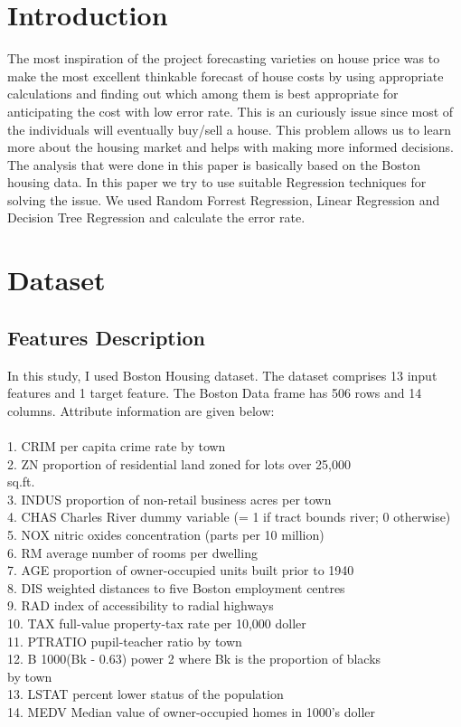 \documentclass[conference]{IEEEtran}
\begin{document}
\section{Introduction}
The most inspiration of the project forecasting varieties on house price was to make the most excellent thinkable forecast of house costs by using appropriate calculations and finding out which among them is best appropriate for anticipating the cost with low error rate. This is an curiously issue since most of the individuals will eventually buy/sell a house. This problem allows us to learn more about the housing market and helps with making more informed decisions. The analysis that were done in this paper is basically based on the Boston housing data. In this paper we try to use suitable Regression techniques for solving the issue. We used Random Forrest Regression, Linear Regression and Decision Tree Regression and calculate the error rate. 

\section{Dataset}

\subsection{Features Description}

In this study, I used Boston Housing dataset. The dataset comprises 13 input features and 1 target feature. The Boston Data frame has 506 rows and 14 columns.
Attribute information are given below:\\
\\
1. CRIM      per capita crime rate by town\\
2. ZN           proportion of residential land        zoned for lots over 25,000\\ sq.ft.\\
3. INDUS     proportion of non-retail business acres per town\\
4. CHAS      Charles River dummy variable (= 1 if tract bounds  river; 0 otherwise)\\
5. NOX       nitric oxides concentration (parts per 10 million)\\
6. RM        average number of rooms per dwelling\\
7. AGE       proportion of owner-occupied units built prior to 1940\\
8. DIS       weighted distances to five Boston employment centres\\
9. RAD       index of accessibility to radial highways\\
10. TAX      full-value property-tax rate per 10,000 doller\\
 
11. PTRATIO  pupil-teacher ratio by town\\
12. B        1000(Bk - 0.63) power 2 where Bk is the proportion of blacks\\ by town\\
13. LSTAT    percent lower status of the population\\
14. MEDV     Median value of owner-occupied homes in 1000's doller\\
\end{document}
